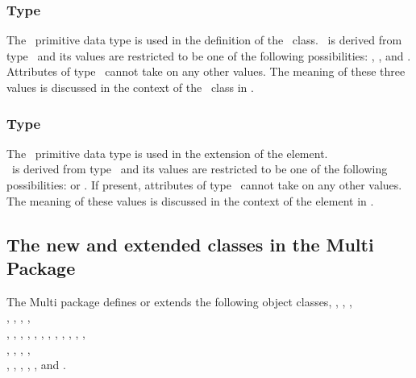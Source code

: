 \subsubsection{Type \RelationPT}
\label{def:Primtype:Relation}

The \RelationPT\ primitive data type is used in the definition of the \SubListOfSpeciesFeatures\ class. \RelationPT\ is derived from type \stringPT\ and its values are restricted to be one of the following possibilities: , , and . Attributes of type \RelationPT\ cannot take on any other values. The meaning of these three values is discussed in the context of the \SubListOfSpeciesFeatures\ class in .

\subsubsection{Type \RepresentationTypePT}
\label{def:Primtype:RepresentationType}

The \RepresentationTypePT\ primitive data type is used in the extension of the  element.\\ \RepresentationTypePT\ is derived from type \stringPT\ and its values are restricted to be one of the following possibilities:  or . If present, attributes of type \RepresentationTypePT\ cannot take on any other values. The meaning of these values is discussed in the context of the   element in .

\subsection{The new and extended classes in the Multi Package}
\label{def:NewClasses}

The Multi package defines or extends the following object classes, \ExModel, \ListOfSpeciesTypes, \ExCompartment,\\ 
\ListOfCompartmentReferences, \CompartmentReference, \SpeciesType, \ListOfSpeciesTypeInstances, \\
\ListOfSpeciesFeatureTypes, \ListOfInSpeciesTypeBonds, \ListOfSpeciesTypeComponentIndexes, \SpeciesFeatureType,
\ListOfPossibleSpeciesFeatureValues, \PossibleSpeciesFeatureValue, \SpeciesTypeInstance, \InSpeciesTypeBond,
\SpeciesTypeComponentIndex, \ExSpecies, \ListOfOutwardBindingSites, \ListOfSpeciesFeatures, \\
\SubListOfSpeciesFeatures, \OutwardBindingSite, \SpeciesFeature, \ListOfSpeciesFeatureValues, \\
\SpeciesFeatureValue, \ExReaction, \ExSimpleSpeciesReference, \ExSpeciesReference, \ListOfSpeciesTypeComponentMapsInProduct, and  \SpeciesTypeComponentMapInProduct.  

